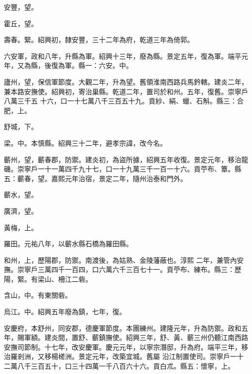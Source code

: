 \begin{pinyinscope}
 安豐，望。



 霍丘，望。



 壽春。緊。紹興初，隸安豐，三十二年為府，乾道三年為倚郭。



 六安軍，政和八年，升縣為軍。紹興十三年，廢為縣。景定五年，復為軍。端平元年，又為縣，後復為軍。縣一：六安。中。



 廬州，望，保信軍節度。大觀二年，升為望。舊領淮南西路兵馬鈐轄。建炎二年，兼本路安撫使。紹興初，寄治巢縣。乾道二年，置司於和州。五年，復舊。崇寧戶八萬三千五
 十六，口一十七萬八千三百五十九。貢紗、絹、蠟、石斛。縣三：合肥，上。



 舒城，下。



 梁。中。本慎縣。紹興三十二年，避孝宗諱，改今名。



 蘄州，望，蘄春郡，防禦。建炎初，為盜所據，紹興五年收復。景定元年，移治龍磯。崇寧戶一十一萬四千九十七，口一十九萬三千一百一十六。貢苧布、簟。縣五：蘄春，望。嘉熙元年治宿，景定二年，隨州治泰和門外。



 蘄水，望。



 廣濟，望。



 黃梅，上。



 羅田。元祐八年，以蘄水縣石橋為羅田縣。



 和州，上，歷陽郡，防禦。南渡後，為姑熟、金陵藩蔽也。淳熙
 二年，兼管內安撫。崇寧戶三萬四千一百四，口六萬六千三百七十一。貢苧布、練布。縣三：歷陽，緊。有梁山、柵江二砦。



 含山，中。有東關砦。



 烏江。中。紹興五年廢為鎮，七年，復。



 安慶府，本舒州，同安郡，德慶軍節度。本團練州。建隆元年，升為防禦。政和五年，賜軍額。建炎間，置舒、蘄鎮撫使。紹興三年，舒、黃、蘄三州仍聽江南西路安撫司節制。十七年，改安慶軍。慶元元年，以寧宗潛邸，升為府。端平三年，移治羅剎洲，又移楊槎洲。景定元年，改築宜城。舊屬
 沿江制置使司。崇寧戶一十二萬八千三百五十，口三十四萬一千八百六十六。貢白朮。縣五：懷寧，上。




\end{pinyinscope}

